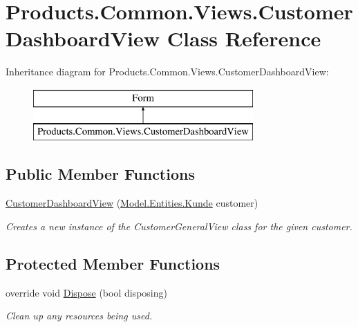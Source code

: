 \hypertarget{class_products_1_1_common_1_1_views_1_1_customer_dashboard_view}{}\section{Products.\+Common.\+Views.\+Customer\+Dashboard\+View Class Reference}
\label{class_products_1_1_common_1_1_views_1_1_customer_dashboard_view}
Inheritance diagram for Products.\+Common.\+Views.\+Customer\+Dashboard\+View\+:\begin{figure}[H]
\begin{center}
\leavevmode
\includegraphics[height=2.000000cm]{class_products_1_1_common_1_1_views_1_1_customer_dashboard_view}
\end{center}
\end{figure}
\subsection*{Public Member Functions}
\begin{DoxyCompactItemize}
\item 
\hyperlink{class_products_1_1_common_1_1_views_1_1_customer_dashboard_view_a2eb512c992b51bbfdba6b84c80b8b384}{Customer\+Dashboard\+View} (\hyperlink{class_products_1_1_model_1_1_entities_1_1_kunde}{Model.\+Entities.\+Kunde} customer)
\begin{DoxyCompactList}\small\item\em Creates a new instance of the Customer\+General\+View class for the given customer. \end{DoxyCompactList}\end{DoxyCompactItemize}
\subsection*{Protected Member Functions}
\begin{DoxyCompactItemize}
\item 
override void \hyperlink{class_products_1_1_common_1_1_views_1_1_customer_dashboard_view_af4e3b0f63c8fc006f0ec169e4c16c59b}{Dispose} (bool disposing)
\begin{DoxyCompactList}\small\item\em Clean up any resources being used. \end{DoxyCompactList}\end{DoxyCompactItemize}


